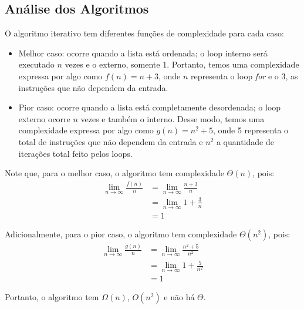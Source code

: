 \subsection{Análise dos Algoritmos}
O algoritmo iterativo tem diferentes funções de complexidade para cada caso:
\begin{itemize}
  \item Melhor caso: ocorre quando a lista está ordenada; o loop interno será executado $n$ vezes e o externo, somente 1. Portanto, temos uma complexidade expressa por algo como $f(n) = n + 3$, onde $n$ representa o loop \textit{for} e o 3, as instruções que não dependem da entrada.
  \item Pior caso: ocorre quando a lista está completamente desordenada; o loop externo ocorre $n$ vezes e também o interno. Desse modo, temos uma complexidade expressa por algo como $g(n) = n^2 + 5$, onde 5 representa o total de instruções que não dependem da entrada e $n^2$ a quantidade de iterações total feito pelos loops.
\end{itemize}

Note que, para o melhor caso, o algoritmo tem complexidade $\Theta(n)$, pois:
\begin{align*}
    \lim_{n\to\infty} \frac{f(n)}{n} &= \lim_{n\to\infty} \frac{n + 3}{n} \\
    &= \lim_{n\to\infty} 1 + \frac{3}{n} \\ 
    &= 1 
\end{align*}

Adicionalmente, para o pior caso, o algoritmo tem complexidade $\Theta(n^2)$, pois:
\begin{align*}
    \lim_{n\to\infty} \frac{g(n)}{n} &= \lim_{n\to\infty} \frac{n^2 + 5}{n^2} \\
    &= \lim_{n\to\infty} 1 + \frac{5}{n^2} \\ 
    &= 1 
\end{align*}

Portanto, o algoritmo tem $\Omega(n)$, $O(n^2)$ e não há $\Theta$.
